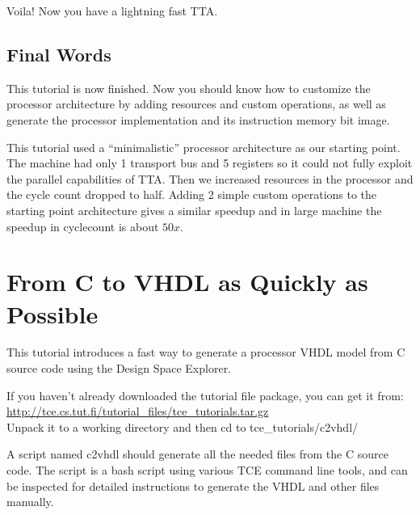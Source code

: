 \documentclass[twoside]{tceusermanual}
\begin{document}



Voila! Now you have a lightning fast TTA. %

\subsection{Final Words}

This tutorial is now finished. Now you should know how to customize
the processor architecture by adding resources and custom operations,
as well as generate the processor implementation and its instruction
memory bit image.

This tutorial used a ``minimalistic'' processor architecture as our
starting point. The machine had only 1 transport bus and 5 registers
so it could not fully exploit the parallel capabilities of TTA.  Then
we increased resources in the processor and the cycle count dropped to
half. Adding 2 simple custom operations to the starting point
architecture gives a similar speedup and in large machine the speedup
in cyclecount is about $50x$.

\section{From C to VHDL as Quickly as Possible}
\label{section:fromCtoVHDL}
 
This tutorial introduces a fast way to generate a processor VHDL model
from C source code using the Design Space Explorer.
 
If you haven't already downloaded the tutorial file package, you can get it 
from:\\
\url{http://tce.cs.tut.fi/tutorial_files/tce_tutorials.tar.gz} \\
Unpack it to a working directory and then cd to tce\_tutorials/c2vhdl/

A script named c2vhdl should generate all the needed files from the C source
code. The script is a bash script using various TCE command line tools, and
can be inspected for detailed instructions to generate the VHDL and other
files manually.
\end{document}
